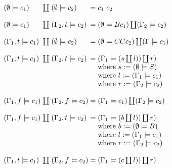 \documentclass[conference]{IEEEtran}
\begin{document}
\begin{equation*}
    \arraycolsep=1.4pt
    \begin{array}{l l l l l}
        (\emptyset \models c_1)  & \coprod & (\emptyset \models c_2)  & = & c_1 \ c_2                                                \\
        \\
        (\emptyset \models c_1)  & \coprod & (\Gamma_2,t \models c_2) & = & (\emptyset \models B c_1) \coprod (\Gamma_2 \models c_2) \\
        \\
        (\Gamma_1,t \models c_1) & \coprod & (\emptyset \models c_2)  & = & (\emptyset \models C C c_2) \coprod (\Gamma \models c_1) \\
        \\
        (\Gamma_1,t \models c_1) & \coprod & (\Gamma_2,t \models c_2) & = & (\Gamma_1 \models (s \coprod l)) \coprod r)              \\
                                 &         &                          &   & \text{where } s := (\emptyset \models S )                \\
                                 &         &                          &   & \text{where } l := (\Gamma_1 \models c_1 )               \\
                                 &         &                          &   & \text{where } r := (\Gamma_2 \models c_2 )               \\
        \\
        (\Gamma_1,f \models c_1) & \coprod & (\Gamma_2,f \models c_2) & = & (\Gamma_1 \models c_1) \coprod (\Gamma_2 \models c_2)    \\
        \\
        (\Gamma_1,f \models c_1) & \coprod & (\Gamma_2,t \models c_2) & = & (\Gamma_1 \models (b \coprod l)) \coprod r)              \\
                                 &         &                          &   & \text{where } b := (\emptyset \models B )                \\
                                 &         &                          &   & \text{where } l := (\Gamma_1 \models c_1 )               \\
                                 &         &                          &   & \text{where } r := (\Gamma_2 \models c_2 )               \\
        \\
        (\Gamma_1,t \models c_1) & \coprod & (\Gamma_2,f \models c_2) & = & (\Gamma_1 \models (c \coprod l)) \coprod r)              \\

\end{array}
\end{equation*}
\end{document}
